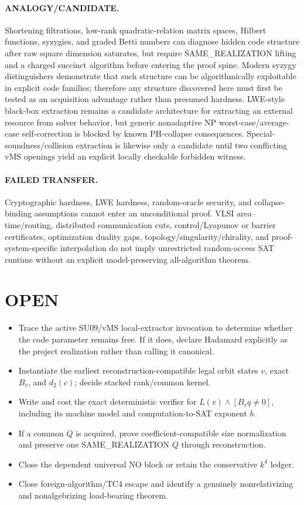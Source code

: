 \documentclass[11pt]{article}
\begin{document}
\paragraph{ANALOGY/CANDIDATE.}
Shortening filtrations, low-rank quadratic-relation matrix spaces, Hilbert functions, syzygies, and graded Betti numbers can diagnose hidden code structure after raw square dimension saturates, but require SAME\_REALIZATION lifting and a charged succinct algorithm before entering the proof spine. Modern syzygy distinguishers demonstrate that such structure can be algorithmically exploitable in explicit code families; therefore any structure discovered here must first be tested as an acquisition advantage rather than presumed hardness. LWE-style black-box extraction remains a candidate architecture for extracting an external resource from solver behavior, but generic nonadaptive NP worst-case/average-case self-correction is blocked by known PH-collapse consequences. Special-soundness/collision extraction is likewise only a candidate until two conflicting vMS openings yield an explicit locally checkable forbidden witness.

\paragraph{FAILED TRANSFER.}
Cryptographic hardness, LWE hardness, random-oracle security, and collapse-binding assumptions cannot enter an unconditional proof. VLSI area--time/routing, distributed communication cuts, control/Lyapunov or barrier certificates, optimization duality gaps, topology/singularity/chirality, and proof-system-specific interpolation do not imply unrestricted random-access SAT runtime without an explicit model-preserving all-algorithm theorem.

\section*{OPEN}
\begin{itemize}
\item Trace the active SU09/vMS local-extractor invocation to determine whether the code parameter remains free. If it does, declare Hadamard explicitly as the project realization rather than calling it canonical.
\item Instantiate the earliest reconstruction-compatible legal orbit states \(v\), exact \(B_v\), and \(d_2(c)\); decide stacked rank/common kernel.
\item Write and cost the exact deterministic verifier for \(L(v)\wedge[B_vq\ne0]\), including its machine model and computation-to-SAT exponent \(b\).
\item If a common \(Q\) is acquired, prove coefficient-compatible size normalization and preserve one SAME\_REALIZATION \(Q\) through reconstruction.
\item Close the dependent universal NO block or retain the conservative \(k^4\) ledger.
\item Close foreign-algorithm/TC4 escape and identify a genuinely nonrelativizing and nonalgebrizing load-bearing theorem.
\end{itemize}
\end{document}

